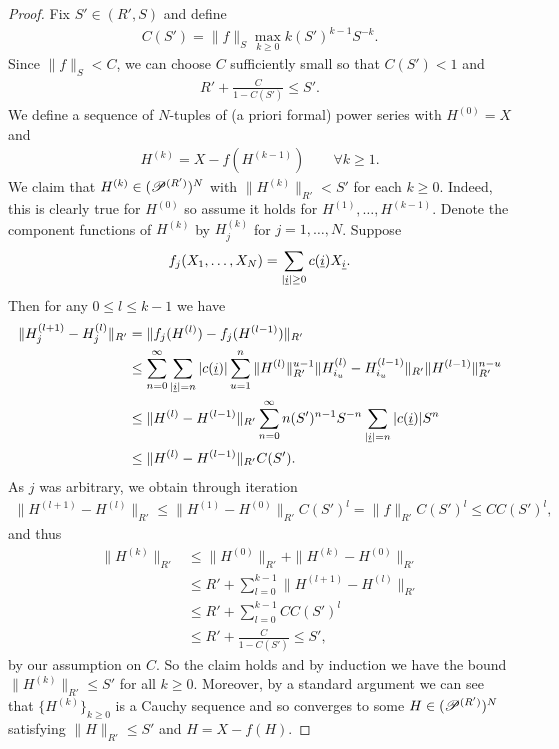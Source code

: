 \begin{proof}
Fix $S'\in (R', S)$ and define
	\begin{align*}
		C(S')=\|f\|_S \max_{k\geq 0} k(S')^{k-1}S^{-k}.
	\end{align*}
Since $\|f\|_S<C$, we can choose $C$ sufficiently small so that $C(S')<1$ and
	\begin{align*}
		R'+\frac{C}{1-C(S')}\leq S'.
	\end{align*}
We define a sequence of $N$-tuples of (a priori formal) power series with $H^{(0)}=X$ and
	\begin{align*}
		H^{(k)}= X- f(H^{(k-1)})\qquad \forall k\geq 1.
	\end{align*}
We claim that $H^{(k)}\in (\P^{(R')})^N$ with $\|H^{(k)}\|_{R'}<S'$ for each $k\geq 0$. Indeed, this is clearly true for $H^{(0)}$ so assume it holds for $H^{(1)},\ldots, H^{(k-1)}$. Denote the component functions of $H^{(k)}$ by $H^{(k)}_j$ for $j=1,\ldots, N$. Suppose
	\begin{align*}
		f_j(X_1,\ldots, X_N)=\sum_{|\ul{i}|\geq 0} c(\ul{i}) X_{\ul{i}}.
	\end{align*}
Then for any $0\leq l\leq k-1$ we have
	\begin{align*}
		\|H^{(l+1)}_j - H^{(l)}_j\|_{R'} &= \| f_j(H^{(l)}) - f_j(H^{(l-1)})\|_{R'} \\
			&\leq \sum_{n=0}^\infty \sum_{|\ul{i}|=n} |c(\ul{i})| \sum_{u=1}^n \| H^{(l)}\|_{R'}^{u-1} \| H^{(l)}_{i_u} - H^{(l-1)}_{i_u}\|_{R'} \| H^{(l-1)}\|_{R'}^{n-u}\\
			&\leq\|H^{(l)} - H^{(l-1)}\|_{R'}\sum_{n=0}^\infty n(S')^{n-1}S^{-n}\sum_{|\ul{i}|=n} |c(\ul{i})| S^n\\
			&\leq \|H^{(l)} - H^{(l-1)}\|_{R'} C(S').
	\end{align*}
As $j$ was arbitrary, we obtain through iteration
	\begin{align*}
		\|H^{(l+1)} - H^{(l)}\|_{R'} \leq \|H^{(1)} - H^{(0)}\|_{R'} C(S')^l = \| f\|_{R'} C(S')^l \leq C C(S')^l,
	\end{align*}
and thus
	\begin{align*}
		\| H^{(k)}\|_{R'} &\leq \|H^{(0)}\|_{R'} + \|H^{(k)}- H^{(0)}\|_{R'} \\
				&\leq R' + \sum_{l=0}^{k-1} \|H^{(l+1)} - H^{(l)}\|_{R'} \\
				&\leq R' + \sum_{l=0}^{k-1} C C(S')^l \\
				&\leq R' + \frac{C}{1 - C(S')} \leq S',
	\end{align*}
by our assumption on $C$. So the claim holds and by induction we have the bound $\|H^{(k)}\|_{R'}\leq S'$ for all $k\geq 0$. Moreover, by a standard argument we can see that $\{H^{(k)}\}_{k\geq 0}$ is a Cauchy sequence and so converges to some $H\in (\P^{(R')})^N$ satisfying $\|H\|_{R'}\leq S'$ and $H=X-f(H)$.


\end{proof}
